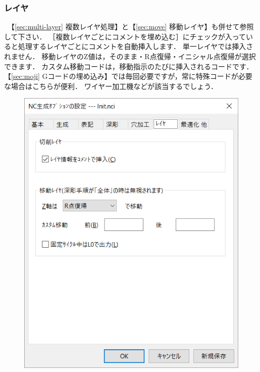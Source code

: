\subsubsection{レイヤ}
\begin{minipage}[t]{0.5\textwidth}
　【\ref{sec:multi-layer} 複数レイヤ処理】と【\ref{sec:move} 移動レイヤ】も併せて参照して下さい．
［複数レイヤごとにコメントを埋め込む］にチェックが入っていると処理するレイヤごとにコメントを自動挿入します．
単一レイヤでは挿入されません．
移動レイヤのZ値は，そのまま・R点復帰・イニシャル点復帰が選択できます．
カスタム移動コードは，移動指示のたびに挿入されるコードです．
【\ref{sec:moji} Gコードの埋め込み】では毎回必要ですが，常に特殊コードが必要な場合はこちらが便利．
ワイヤー加工機などが該当するでしょう．
\end{minipage}
\begin{minipage}[t]{0.5\textwidth}
\vspace*{-2zh}
\begin{figure}[H]
\centering
\includegraphics[scale=0.7]{No6/fig/init6.png}
\label{fig:init6.png}
\end{figure}
\end{minipage}

